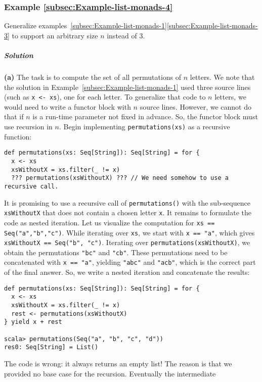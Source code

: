 \subsubsection{Example \label{subsec:Example-list-monads-4}\ref{subsec:Example-list-monads-4}}

Generalize examples~\ref{subsec:Example-list-monads-1}\textendash \ref{subsec:Example-list-monads-3}
to support an arbitrary size $n$ instead of $3$.

\subparagraph{Solution}

\textbf{(a)} The task is to compute the set of all permutations of
$n$ letters. We note that the solution in Example~\ref{subsec:Example-list-monads-1}
used three source lines (such as \lstinline!x <- xs!), one for each
letter. To generalize that code to $n$ letters, we would need to
write a functor block with $n$ source lines. However, we cannot do
that if $n$ is a run-time parameter not fixed in advance. So, the
functor block must use recursion in $n$. Begin implementing \lstinline!permutations(xs)!
as a recursive function:
\begin{lstlisting}
def permutations(xs: Seq[String]): Seq[String] = for {
  x <- xs
  xsWithoutX = xs.filter(_ != x)
  ??? permutations(xsWithoutX) ??? // We need somehow to use a recursive call.
\end{lstlisting}
It is promising to use a recursive call of \lstinline!permutations()!
with the sub-sequence \lstinline!xsWithoutX! that does not contain
a chosen letter \lstinline!x!. It remains to formulate the code as
nested iteration. Let us visualize the computation for \lstinline!xs == Seq("a","b","c")!.
While iterating over \lstinline!xs!, we start with \lstinline!x == "a"!,
which gives \lstinline!xsWithoutX == Seq("b", "c")!. Iterating over
\lstinline!permutations(xsWithoutX)!, we obtain the permutations
\lstinline!"bc"! and \lstinline!"cb"!. These permutations need to
be concatenated with \lstinline!x == "a"!, yielding \lstinline!"abc"!
and \lstinline!"acb"!, which is the correct part of the final answer.
So, we write a nested iteration and concatenate the results:
\begin{lstlisting}
def permutations(xs: Seq[String]): Seq[String] = for {
  x <- xs
  xsWithoutX = xs.filter(_ != x)
  rest <- permutations(xsWithoutX)
} yield x + rest

scala> permutations(Seq("a", "b", "c", "d"))
res0: Seq[String] = List()
\end{lstlisting}
The code is wrong: it always returns an empty list! The reason is
that we provided no base case for the recursion. Eventually the intermediate
